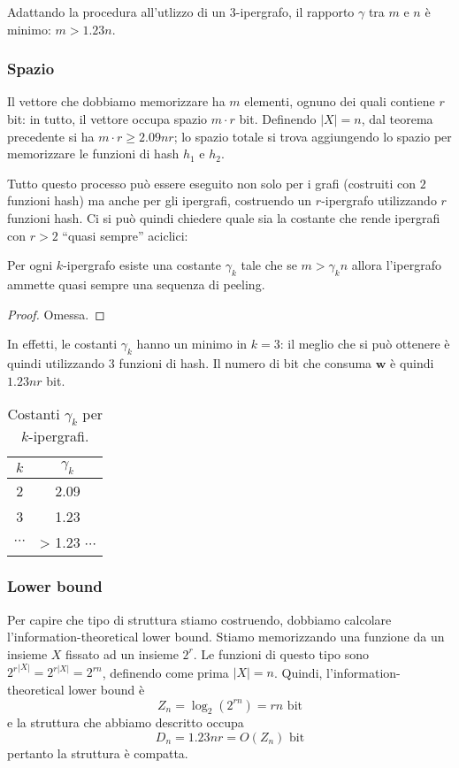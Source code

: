 Adattando la procedura all'utlizzo di un $3$-ipergrafo, il rapporto $\gamma$ tra $m$ e $n$ è minimo: $m>1.23n$.


\subsubsection{Spazio}
Il vettore che dobbiamo memorizzare ha $m$ elementi, ognuno dei quali contiene $r$ bit: in tutto, 
il vettore occupa spazio $m\cdot r$ bit. Definendo $|X| = n$, dal teorema precedente si ha 
$m\cdot r \geq 2.09nr$; lo spazio totale si trova aggiungendo lo spazio per memorizzare 
le funzioni di hash $h_1$ e $h_2$.  

Tutto questo processo può essere eseguito non solo per i grafi (costruiti con $2$ funzioni hash)
ma anche per gli ipergrafi, costruendo un $r$-ipergrafo utilizzando $r$ funzioni hash. Ci si può 
quindi chiedere quale sia la costante che rende ipergrafi con $r > 2$ ``quasi sempre'' aciclici: 
\begin{theorem}
    Per ogni $k$-ipergrafo esiste una costante $\gamma_k$ tale che se $m > \gamma_k n$ allora 
    l'ipergrafo ammette quasi sempre una sequenza di peeling. 
\end{theorem}
\begin{proof}
    Omessa.
\end{proof}

In effetti, le costanti $\gamma_k$ hanno un minimo in $k = 3$: il meglio che si può 
ottenere è quindi utilizzando $3$ funzioni di hash. Il numero di bit che consuma 
$\mathbf{w}$ è quindi $1.23nr$ bit.  

\begin{table}[htpb]
    \centering
    \begin{tabular}{c|c}
	 $k$ &  $\gamma_k$ \\ 
	 \hline 
	 2 & 2.09 \\
	 3 & 1.23 \\
	 $\cdots$ & > 1.23 $\cdots$
    \end{tabular}
    \caption{Costanti $\gamma_k$ per $k$-ipergrafi.}
    \label{tab:gamma_k_hypergraph}
\end{table}

\subsubsection{Lower bound}
Per capire che tipo di struttura stiamo costruendo, dobbiamo calcolare l'information-theoretical 
lower bound. Stiamo memorizzando una funzione da un insieme $X$ fissato ad un insieme $2^r$.  
Le funzioni di questo tipo sono ${2^{r}}^{|X|} = 2^{r|X|} = 2^{rn}$, definendo come prima $|X| = n$. 
Quindi, l'information-theoretical lower bound è 
$$
Z_n = \log_2(2^{rn}) = rn \text{ bit}
$$
e la struttura che abbiamo descritto occupa 
$$
D_n = 1.23nr = O(Z_n) \text{ bit}
$$
pertanto la struttura è compatta.

